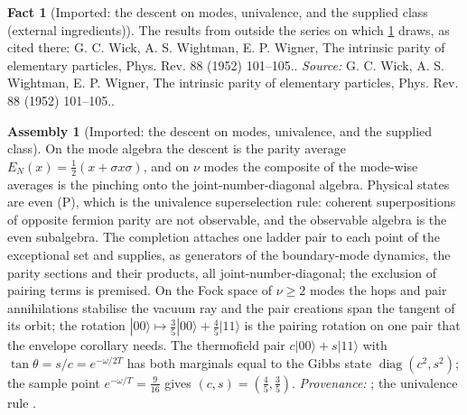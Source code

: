 \documentclass[11pt]{article}
\theoremstyle{definition}
\newtheorem{fact}[theorem]{Fact}
\newtheorem{assembled}[theorem]{Assembly}
\theoremstyle{plain}
\providecommand{\EN}{}\renewcommand{\EN}{E_{N}}
\providecommand{\ket}{}\renewcommand{\ket}[1]{|#1\rangle}
\begin{document}
\begin{fact}[Imported: the descent on modes, univalence, and the supplied class (external ingredients)]\label{c:descent-lift.imported-descent-modes-univalence-supplied-class-external}
The results from outside the series on which \ref{c:descent-lift.imported-descent-modes-univalence-supplied-class} draws, as cited there: G. C. Wick, A. S. Wightman, E. P. Wigner, The intrinsic parity of elementary particles, Phys. Rev. 88 (1952) 101--105..
\emph{Source:} G. C. Wick, A. S. Wightman, E. P. Wigner, The intrinsic parity of elementary particles, Phys. Rev. 88 (1952) 101--105..
\end{fact}

\begin{assembled}[Imported: the descent on modes, univalence, and the supplied class]\label{c:descent-lift.imported-descent-modes-univalence-supplied-class}
On the mode algebra the descent is the parity average $\EN(x) = \tfrac12(x + \sigma x\sigma)$, and on $\nu$ modes the composite of the mode-wise averages is the pinching onto the joint-number-diagonal algebra. Physical states are even (P), which is the univalence superselection rule: coherent superpositions of opposite fermion parity are not observable, and the observable algebra is the even subalgebra. The completion attaches one ladder pair to each point of the exceptional set and supplies, as generators of the boundary-mode dynamics, the parity sections and their products, all joint-number-diagonal; the exclusion of pairing terms is premised. On the Fock space of $\nu \geq 2$ modes the hops and pair annihilations stabilise the vacuum ray and the pair creations span the tangent of its orbit; the rotation $\ket{00} \mapsto \tfrac35\ket{00} + \tfrac45\ket{11}$ is the pairing rotation on one pair that the envelope corollary needs. The thermofield pair $c\ket{00} + s\ket{11}$ with $\tan\theta = s/c = e^{-\omega/2T}$ has both marginals equal to the Gibbs state $\operatorname{diag}(c^{2}, s^{2})$; the sample point $e^{-\omega/T} = \tfrac{9}{16}$ gives $(c, s) = (\tfrac45, \tfrac35)$. \emph{Provenance:} \cite[Thm.~5.7, Prop.~9.6, Prem.~7.8, Fact~7.9, Prem.~7.30, Thm.~C.8, Prop.~13.4, Cor.~11.6, Lem.~7.2, Thm.~7.27]{ButlerT5}; the univalence rule \cite{WWW1952}.
\end{assembled}
\end{document}
